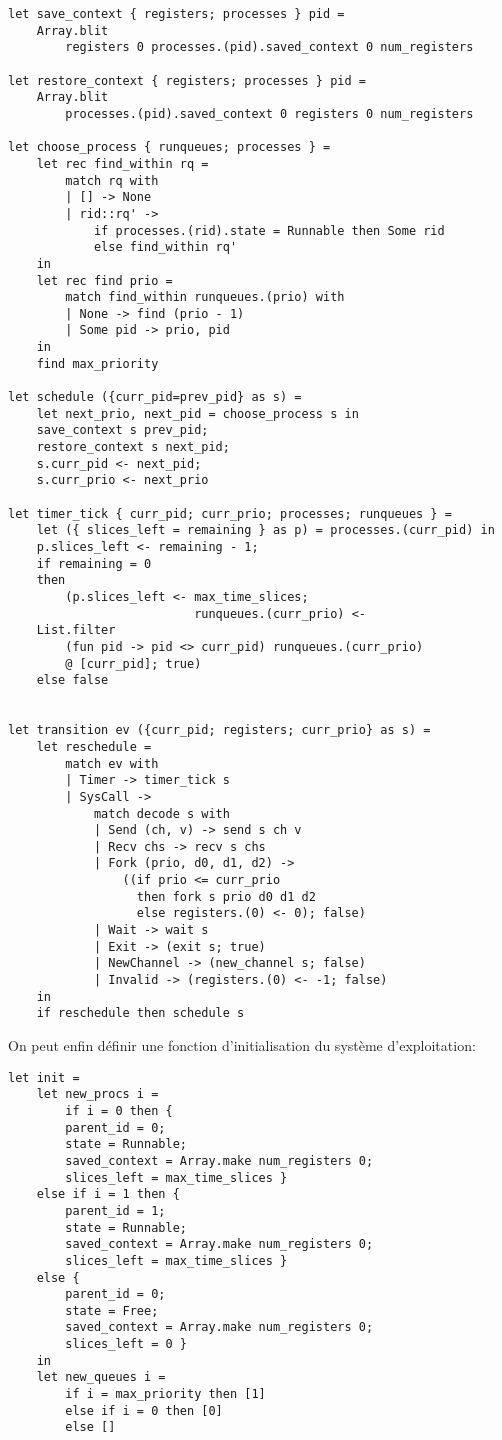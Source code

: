 \documentclass[french, toc]{../cs-classes/cs-classes}
\begin{document}
\begin{verbatim}
let save_context { registers; processes } pid =
    Array.blit
        registers 0 processes.(pid).saved_context 0 num_registers

let restore_context { registers; processes } pid =
    Array.blit
        processes.(pid).saved_context 0 registers 0 num_registers

let choose_process { runqueues; processes } =
    let rec find_within rq =
        match rq with
        | [] -> None
        | rid::rq' ->
            if processes.(rid).state = Runnable then Some rid
            else find_within rq'
    in
    let rec find prio =
        match find_within runqueues.(prio) with
        | None -> find (prio - 1)
        | Some pid -> prio, pid
    in
    find max_priority

let schedule ({curr_pid=prev_pid} as s) =
    let next_prio, next_pid = choose_process s in
    save_context s prev_pid;
    restore_context s next_pid;
    s.curr_pid <- next_pid;
    s.curr_prio <- next_prio

let timer_tick { curr_pid; curr_prio; processes; runqueues } =
    let ({ slices_left = remaining } as p) = processes.(curr_pid) in
    p.slices_left <- remaining - 1;
    if remaining = 0
    then
        (p.slices_left <- max_time_slices;
                          runqueues.(curr_prio) <-
    List.filter
        (fun pid -> pid <> curr_pid) runqueues.(curr_prio)
        @ [curr_pid]; true)
    else false


let transition ev ({curr_pid; registers; curr_prio} as s) =
    let reschedule =
        match ev with
        | Timer -> timer_tick s
        | SysCall ->
            match decode s with
            | Send (ch, v) -> send s ch v
            | Recv chs -> recv s chs
            | Fork (prio, d0, d1, d2) ->
                ((if prio <= curr_prio
                  then fork s prio d0 d1 d2
                  else registers.(0) <- 0); false)
            | Wait -> wait s
            | Exit -> (exit s; true)
            | NewChannel -> (new_channel s; false)
            | Invalid -> (registers.(0) <- -1; false)
    in
    if reschedule then schedule s
\end{verbatim}

On peut enfin définir une fonction d'initialisation du système d'exploitation:
\begin{verbatim}
let init =
    let new_procs i =
        if i = 0 then {
        parent_id = 0;
        state = Runnable;
        saved_context = Array.make num_registers 0;
        slices_left = max_time_slices }
    else if i = 1 then {
        parent_id = 1;
        state = Runnable;
        saved_context = Array.make num_registers 0;
        slices_left = max_time_slices }
    else {
        parent_id = 0;
        state = Free;
        saved_context = Array.make num_registers 0;
        slices_left = 0 }
    in
    let new_queues i =
        if i = max_priority then [1]
        else if i = 0 then [0]
        else []
\end{verbatim}
\end{document}
